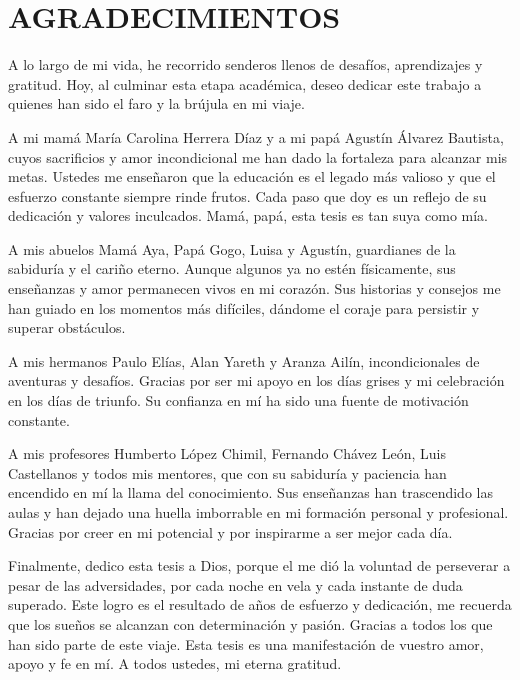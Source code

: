


\chapter*{AGRADECIMIENTOS}
A lo largo de mi vida, he recorrido senderos llenos de desafíos, aprendizajes y gratitud. Hoy, al culminar esta etapa académica, deseo dedicar este trabajo a quienes han sido el faro y la brújula en mi viaje.

A mi mamá María Carolina Herrera Díaz y a mi papá Agustín Álvarez Bautista, cuyos sacrificios y amor incondicional me han dado la fortaleza para alcanzar mis metas. Ustedes me enseñaron que la educación es el legado más valioso y que el esfuerzo constante siempre rinde frutos. Cada paso que doy es un reflejo de su dedicación y valores inculcados. Mamá, papá, esta tesis es tan suya como mía.

A mis abuelos Mamá Aya, Papá Gogo, Luisa y Agustín, guardianes de la sabiduría y el cariño eterno. Aunque algunos ya no estén físicamente, sus enseñanzas y amor permanecen vivos en mi corazón. Sus historias y consejos me han guiado en los momentos más difíciles, dándome el coraje para persistir y superar obstáculos.

A mis hermanos Paulo Elías, Alan Yareth y Aranza Ailín, incondicionales de aventuras y desafíos. Gracias por ser mi apoyo en los días grises y mi celebración en los días de triunfo. Su confianza en mí ha sido una fuente de motivación constante.

A mis profesores Humberto López Chimil, Fernando Chávez León, Luis Castellanos y todos mis mentores, que con su sabiduría y paciencia han encendido en mí la llama del conocimiento. Sus enseñanzas han trascendido las aulas y han dejado una huella imborrable en mi formación personal y profesional. Gracias por creer en mi potencial y por inspirarme a ser mejor cada día.

Finalmente, dedico esta tesis a Dios, porque el me dió la voluntad de perseverar a pesar de las adversidades, por cada noche en vela y cada instante de duda superado. Este logro es el resultado de años de esfuerzo y dedicación, me recuerda que los sueños se alcanzan con determinación y pasión. Gracias a todos los que han sido parte de este viaje. Esta tesis es una manifestación de vuestro amor, apoyo y fe en mí. A todos ustedes, mi eterna gratitud.